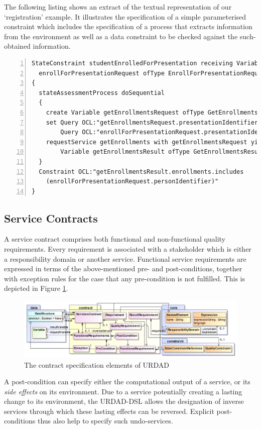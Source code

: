The following listing shows an extract of the textual representation of our `registration' example. It illustrates the specification of a simple parameterised constraint which includes the specification of a process that extracts information from the environment as well as a data constraint to be checked against the such-obtained information.
\tiny \begin{lstlisting}[numbers=left,escapechar=|]
StateConstraint studentEnrolledForPresentation receiving Variable 
  enrollForPresentationRequest ofType EnrollForPresentationRequest
{
  stateAssessmentProcess doSequential
  {
    create Variable getEnrollmentsRequest ofType GetEnrollmentsRequest
    set Query OCL:"getEnrollmentsRequest.presentationIdentifier" equalTo
        Query OCL:"enrollForPresentationRequest.presentationIdentifier"
    requestService getEnrollments with getEnrollmentsRequest yielding
        Variable getEnrollmentsResult ofType GetEnrollmentsResult
  }
  Constraint OCL:"getEnrollmentsResult.enrollments.includes
    (enrollForPresentationRequest.personIdentifier)"
}
\end{lstlisting}\normalsize

\subsection{Service Contracts}

A service contract comprises both functional and non-functional quality requirements. Every requirement is associated with a stakeholder which is either a responsibility domain or another service. Functional service requirements are expressed in terms of the above-mentioned pre- and post-conditions, together with exception rules for the case that any pre-condition is not fulfilled. This is depicted in Figure \ref{fig:metamodel-3}.
\begin{figure}[Htbp]
  \centering
  \includegraphics{contract}
  \caption{The contract specification elements of URDAD}
  \label{fig:metamodel-3}
\end{figure}

A post-condition can specify either the computational output of a service, or its \emph{side effects} on its environment. Due to a service potentially creating a lasting change to its environment, the URDAD-DSL allows the designation of inverse services through which these lasting effects can be reversed. Explicit post-conditions thus also help to specify such undo-services.

